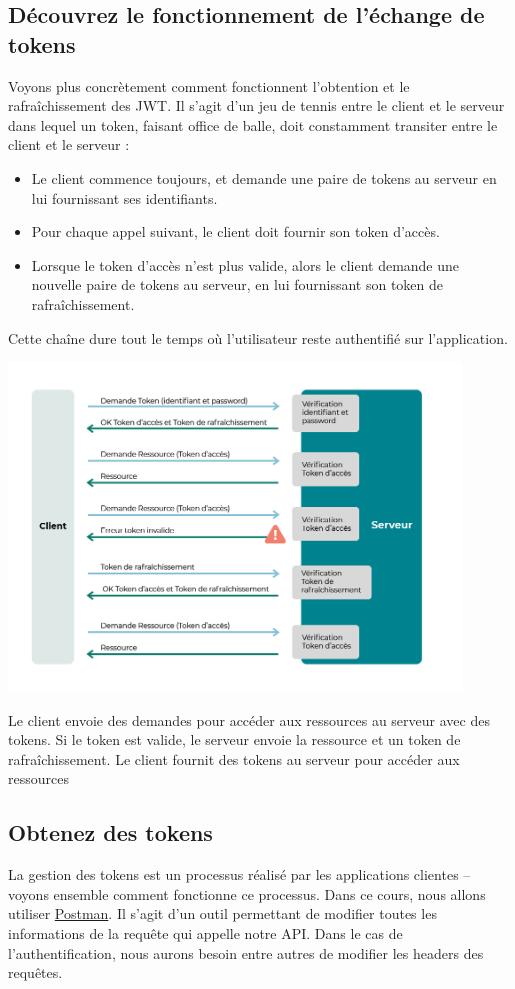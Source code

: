 \documentclass[a4paper]{article}
\begin{document}
\subsection{Découvrez le fonctionnement de l’échange de tokens}
Voyons plus concrètement comment fonctionnent l’obtention et le rafraîchissement des JWT. Il s’agit d’un {\color{monOrange}jeu de tennis} entre le client et le serveur dans lequel un token, faisant office de balle, doit constamment transiter entre le client et le serveur :
\begin{itemize}
\item Le client commence toujours, et {\color{monOrange}demande une paire de tokens} au serveur en lui fournissant ses identifiants.
\item Pour chaque appel suivant, le client doit fournir son {\color{monOrange}token d’accès}.
\item Lorsque le token d’accès n’est plus valide, alors le client demande une {\color{monOrange}nouvelle paire de tokens} au serveur, en lui fournissant son {\color{monOrange}token de rafraîchissement}.
\end{itemize}
Cette chaîne dure tout le temps où l’utilisateur reste authentifié sur l’application.
\begin{center}
\includegraphics[width=12cm]{images/image23.png}
\end{center}
Le client envoie des demandes pour accéder aux ressources au serveur avec des tokens. Si le token est valide, le serveur envoie la ressource et un token de rafraîchissement.
Le client fournit des tokens au serveur pour accéder aux ressources

\subsection{Obtenez des tokens}
La {\color{monOrange}gestion des tokens} est un processus réalisé par les applications clientes – voyons ensemble comment fonctionne ce processus. Dans ce cours, nous allons utiliser \href{https://www.postman.com}{Postman}. Il s’agit d’un outil permettant de modifier toutes les informations de la requête qui appelle notre API. Dans le cas de {\color{monOrange}l’authentification}, nous aurons besoin entre autres de modifier les headers des requêtes.
\end{document}
